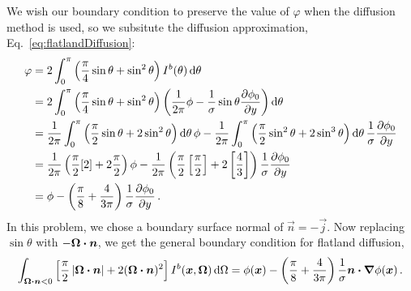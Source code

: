 We wish our boundary condition to preserve the value of
$\varphi$ when the diffusion method is used, so we subsitute the diffusion
approximation, Eq.~\eqref{eq:flatlandDiffusion}:
\begin{align*}
 \varphi &= 2\int_{0}^{\pi} \left( \frac{\pi}{4} \sin\theta + \sin^2\theta \right)
 I^b(\theta) \mathop{}\!\mathrm{d}\theta
 \\
 &= 
  2\int_{0}^{\pi} \left( \frac{\pi}{4} \sin\theta + \sin^2\theta \right)
 \left( \frac{1}{2\pi} \phi -
  \frac{1}{\sigma} \sin\theta \frac{\partial \phi_0}{\partial y}\right)\mathop{}\!\mathrm{d}\theta
\\
 &= 
\frac{1}{2\pi} \int_{0}^{\pi} \left( \frac{\pi}{2} \sin\theta + 2 \sin^2\theta
\right)\mathop{}\!\mathrm{d}\theta
 \,\phi -
 \frac{1}{2\pi} \int_{0}^{\pi} \left( \frac{\pi}{2} \sin^2\theta + 2 \sin^3\theta \right)\mathop{}\!\mathrm{d}\theta
  \,\frac{1}{\sigma} \frac{\partial \phi_0}{\partial y}
  \\
 &= 
 \frac{1}{2\pi} \left( \frac{\pi}{2} [2] + 2 \frac{\pi}{2}
\right) \phi
-
\frac{1}{2\pi} \left( \frac{\pi}{2} \left[ \frac{\pi}{2} \right] + 2 \left[
\frac{4}{3} \right] \right) \frac{1}{\sigma} \frac{\partial \phi_0}{\partial y}
\\
 &= 
  \phi
- \left( \frac{\pi}{8} + \frac{4}{3\pi} \right) \frac{1}{\sigma} \frac{\partial \phi_0}{\partial y}
\,.
\end{align*}
In this problem, we chose a boundary surface normal of $\vec{n}=-\vec{j}$. Now
replacing $\sin \theta$ with $-\bm{\Omega}\bm{\cdot}\bm{n}$, we get the general
boundary condition for flatland diffusion,
\begin{equation} \label{eq:flatlandDiffusionVarBc}
\int_{\bm{\Omega}\bm{\cdot}\bm{n} < 0} \left[ \frac{\pi}{2}
\left| \bm{\Omega}\bm{\cdot}\bm{n} \right| + 2 (\bm{\Omega}\bm{\cdot}\bm{n})^2 \right]
I^b(\bm{x}, \bm{\Omega}) \mathop{}\!\mathrm{d}\Omega
= 
  \phi(\bm{x})
  - \left( \frac{\pi}{8} + \frac{4}{3\pi} \right) \frac{1}{\sigma}
  \bm{n}\bm{\cdot}\bm{\nabla} \phi(\bm{x})\,.
\end{equation}


